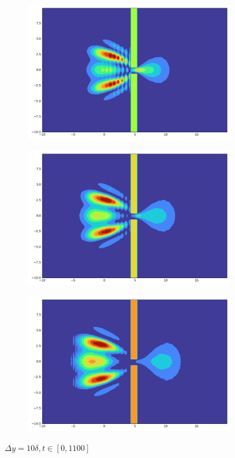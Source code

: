 \begin{figure}[h]
\begin{subfigure}{0.3\linewidth}
    \end{subfigure}
    \begin{subfigure}{0.3\linewidth}
        \includegraphics[width=\linewidth]{5/900}
    \end{subfigure}
    \begin{subfigure}{0.3\linewidth}
        \includegraphics[width=\linewidth]{5/1000}
    \end{subfigure}
    \begin{subfigure}{0.3\linewidth}
        \includegraphics[width=\linewidth]{5/1100}
    \end{subfigure}
    \caption{$\Delta y=10\delta,t\in[0,1100]$}
\end{figure}
